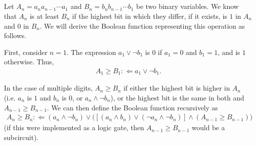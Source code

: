 \documentclass[a4paper,12pt]{article}
\theoremstyle{remark}
\begin{document}
\subsection{}
Let $A_n = a_n a_{n - 1} \cdots a_1$ and $B_n = b_n b_{n - 1} \cdots b_1$ be two binary variables. We know that $A_n$ is at least $B_n$ if the highest bit in which they differ, if it exists, is $1$ in $A_n$ and $0$ in $B_n$. %
We will derive the Boolean function representing this operation as follows. \par
First, consider $n = 1$. The expression $a_1 \lor \neg b_1$ is $0$ if $a_1 = 0$ and $b_1 = 1$, and is $1$ otherwise. Thus,
\begin{align*}
    A_1 \geq B_1 :\Leftarrow a_1 \lor \neg b_1.
\end{align*} \par
In the case of multiple digits, $A_n \geq B_n$ if either the highest bit is higher in $A_n$ (i.e. $a_n$ is $1$ and $b_n$ is $0$, or $a_n \land \neg b_n$), or the highest bit is the same in both and $A_{n - 1} \geq B_{n - 1}$. We can then define the Boolean function recursively as
\begin{align*}
    A_n \geq B_n :\Leftarrow (a_n \land \neg b_n) \lor \text{} \bigl( [(a_n \land b_n) \lor (\neg a_n \land \neg b_n)] \land (A_{n - 1} \geq B_{n - 1}) \bigr)
\end{align*}
(if this were implemented as a logic gate, then $A_{n - 1} \geq B_{n - 1}$ would be a subcircuit).
\end{document}
